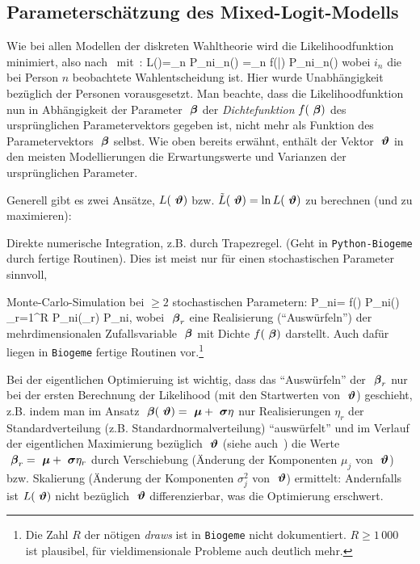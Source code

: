 \subsection{Parametersch\"atzung des Mixed-Logit-Modells}

Wie bei allen Modellen der diskreten Wahltheorie wird die
Likelihoodfunktion minimiert, also nach~
mit~: 
\be
\label{LMix}
L(\vectheta)=\prod_n P_{ni_n}(\vectheta)
=\prod_n 
\int\!\! \diff{\vecbeta} f(\vecbeta|\vectheta) P_{ni_n}(\vecbeta)
\ee
wobei  $i_n$ die bei Person $n$ beobachtete Wahlentscheidung ist.
Hier wurde Unabh\"angigkeit bez\"uglich der Personen vorausgesetzt.
Man beachte, dass die Likelihoodfunktion nun in Abh\"angigkeit der
Parameter  ${\mbox{ \boldmath{$\beta$}}}$ der \emph{Dichtefunktion} $f({\mbox{ \boldmath{$\beta$}}})$ des
urspr\"unglichen Parametervektors gegeben ist,
nicht mehr als Funktion des Parametervektors ${\mbox{ \boldmath{$\beta$}}}$ selbst. Wie
oben bereits erw\"ahnt, enth\"alt der Vektor ${\mbox{ \boldmath{$\vartheta$}}}$ in den
meisten Modellierungen die Erwartungswerte und Varianzen der
urspr\"unglichen Parameter.   

Generell gibt es zwei Ans\"atze, $L({\mbox{ \boldmath{$\vartheta$}}})$
bzw. $\tilde{L}({\mbox{ \boldmath{$\vartheta$}}})=\ln L({\mbox{ \boldmath{$\vartheta$}}})$ zu berechnen (und zu
maximieren):

\bi
\item Direkte numerische Integration, z.B. durch Trapezregel. (Geht in
  \texttt{Python-Biogeme} durch fertige Routinen). Dies ist meist nur f\"ur
  einen stochastischen Parameter sinnvoll,
\item Monte-Carlo-Simulation bei $\ge 2$ stochastischen Parametern:
\be
P_{ni}=\int \diff{\vecbeta} f(\vecbeta) P_{ni}(\vecbeta)
\approx {} \sum_{r=1}^R 
P_{ni}(\vecbeta_r) \equiv P_{ni},
\ee
wobei ${\mbox{ \boldmath{$\beta$}}}_r$ eine Realisierung (``Ausw\"urfeln'') der mehrdimensionalen
Zufallsvariable ${\mbox{ \boldmath{$\beta$}}}$ mit Dichte $f({\mbox{ \boldmath{$\beta$}}})$
darstellt. Auch daf\"ur liegen in \texttt{Biogeme} fertige Routinen
vor.\footnote{Die Zahl $R$ der n\"otigen \emph{draws} ist in \texttt{Biogeme}
  nicht dokumentiert. $R\ge 1\,000$ ist plausibel, f\"ur
  vieldimensionale Probleme auch deutlich mehr.}

Bei der eigentlichen Optimieruing ist wichtig, dass das
``Ausw\"urfeln'' der ${\mbox{ \boldmath{$\beta$}}}_r$ nur bei der ersten Berechnung der
Likelihood (mit den Startwerten von ${\mbox{ \boldmath{$\vartheta$}}}$) geschieht, z.B. indem
man im Ansatz ${\mbox{ \boldmath{$\beta$}}}({\mbox{ \boldmath{$\vartheta$}}})={\mbox{ \boldmath{$\mu$}}}+{\mbox{ \boldmath{$\sigma$}}}\eta$ nur
Realisierungen $\eta_r$ der Standardverteilung
(z.B. Standardnormalverteilung) ``ausw\"urfelt'' und im Verlauf der
eigentlichen Maximierung bez\"uglich ${\mbox{ \boldmath{$\vartheta$}}}$ (siehe
auch~)  die Werte ${\mbox{ \boldmath{$\beta$}}}_r={\mbox{ \boldmath{$\mu$}}}+{\mbox{ \boldmath{$\sigma$}}}\eta_r$
durch Verschiebung (\"Anderung der Komponenten $\mu_j$ von ${\mbox{ \boldmath{$\vartheta$}}}$)
bzw. Skalierung (\"Anderung der Komponenten $\sigma_j^2$ von
${\mbox{ \boldmath{$\vartheta$}}}$) ermittelt: Andernfalls ist $L({\mbox{ \boldmath{$\vartheta$}}})$ nicht bez\"uglich
${\mbox{ \boldmath{$\vartheta$}}}$ differenzierbar, was die Optimierung erschwert.
\ei




